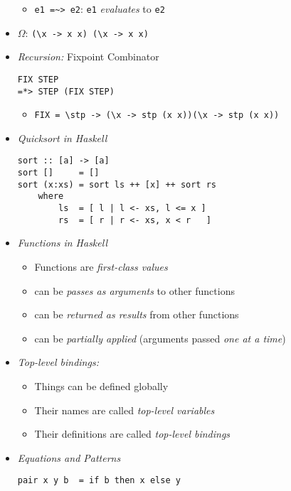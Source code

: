 \documentclass[landscape,8pt]{extarticle}
\newcommand{\code}{\lstinline}
\begin{document}
\begin{multicols}{3}
\begin{itemize}
\begin{itemize}
                  \item \code{e1 =~> e2}: \code{e1} \emph{evaluates} to \code{e2}
              \end{itemize}
        \item $\Omega$: \code{(\x -> x x) (\x -> x x)}
        \item \emph{Recursion:} Fixpoint Combinator
              \begin{lstlisting}
FIX STEP
=*> STEP (FIX STEP)
           \end{lstlisting}
              \begin{itemize}
                  \item \code{FIX = \stp -> (\x -> stp (x x))(\x -> stp (x x))}
              \end{itemize}
        \item \emph{Quicksort in Haskell}
              \begin{lstlisting}
sort :: [a] -> [a]
sort []     = []
sort (x:xs) = sort ls ++ [x] ++ sort rs
    where
        ls  = [ l | l <- xs, l <= x ]
        rs  = [ r | r <- xs, x < r   ]
           \end{lstlisting}
        \item \emph{Functions in Haskell}
              \begin{itemize}
                  \item Functions are \emph{first-class values}
                  \item can be \emph{passes as arguments} to other functions
                  \item can be \emph{returned as results} from other functions
                  \item can be \emph{partially applied} (arguments passed \emph{one at a time})
              \end{itemize}
        \item \emph{Top-level bindings:}
              \begin{itemize}
                  \item Things can be defined globally
                  \item Their names are called \emph{top-level variables}
                  \item Their definitions are called \emph{top-level bindings}
              \end{itemize}
        \item \emph{Equations and Patterns}
              \begin{lstlisting}
pair x y b  = if b then x else y

\end{lstlisting}
\end{itemize}
\end{multicols}
\end{document}
